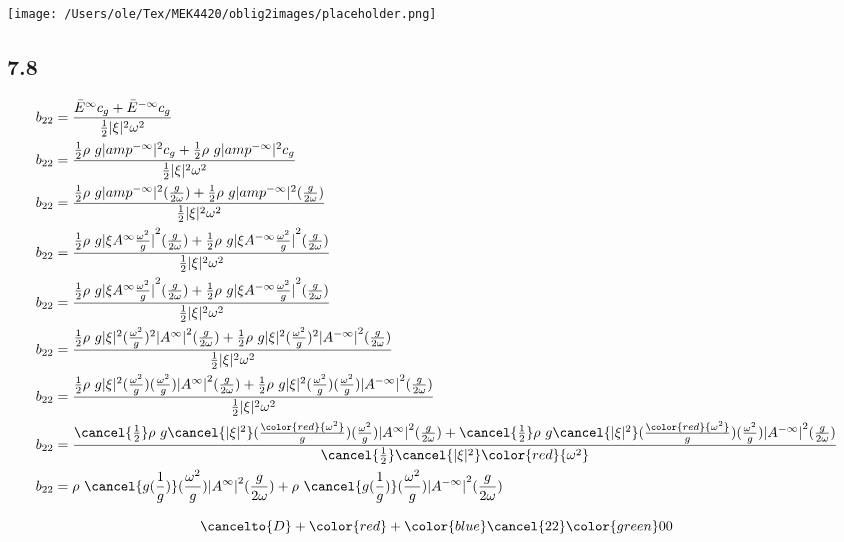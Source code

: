 {\noindent\texttt{[image: /Users/ole/Tex/MEK4420/oblig2images/placeholder.png]}
}

\subsection{7.8}

\begin{align}
	b_{22} &=  \frac{\bar{E}^{\infty} c_g + \bar{E}^{-\infty} c_g }{\frac{1}{2} |\xi|^2 \omega^2}\\
	b_{22} &=  \frac{\frac{1}{2}\rho g |amp^{-\infty}|^2  c_g + \frac{1}{2}\rho g |amp^{-\infty}|^2 c_g }{\frac{1}{2} |\xi|^2 \omega^2}\\
	b_{22} &=  \frac{\frac{1}{2}\rho g |amp^{-\infty}|^2  (\frac{g}{2\omega}) + \frac{1}{2}\rho g |amp^{-\infty}|^2 (\frac{g}{2\omega}) }{\frac{1}{2} |\xi|^2 \omega^2}\\
	b_{22} &=  \frac{\frac{1}{2}\rho g {|\xi A^{\infty} \frac{\omega^2}{g}|}^2  (\frac{g}{2\omega}) + \frac{1}{2}\rho g {|\xi A^{-\infty} \frac{\omega^2}{g}|}^2  (\frac{g}{2\omega}) }{\frac{1}{2} |\xi|^2 \omega^2}\\
	b_{22} &=  \frac{\frac{1}{2}\rho g {|\xi A^{\infty} \frac{\omega^2}{g}|}^2  (\frac{g}{2\omega}) + \frac{1}{2}\rho g {|\xi A^{-\infty} \frac{\omega^2}{g}|}^2  (\frac{g}{2\omega}) }{\frac{1}{2} |\xi|^2 \omega^2}\\
b_{22} &=  \frac{\frac{1}{2}\rho g |\xi|^2 (\frac{\omega^2}{g})^2 {| A^{\infty} |}^2  (\frac{g}{2\omega}) + \frac{1}{2}\rho g |\xi|^2  (\frac{\omega^2}{g})^2 {| A^{-\infty}|}^2  (\frac{g}{2\omega}) }{\frac{1}{2} |\xi|^2 \omega^2}\\
b_{22} &=  \frac{\frac{1}{2}\rho g |\xi|^2 (\frac{\omega^2}{g})(\frac{\omega^2}{g}) {| A^{\infty} |}^2  (\frac{g}{2\omega}) + \frac{1}{2}\rho g |\xi|^2  (\frac{\omega^2}{g})(\frac{\omega^2}{g}) {| A^{-\infty}|}^2  (\frac{g}{2\omega}) }{\frac{1}{2} |\xi|^2 \omega^2}\\
b_{22} &=  \frac{ \cancel{\frac{1}{2}}\rho g \cancel{|\xi|^2} (\frac{\color{red}{\omega^2}}{g})(\frac{\omega^2}{g}) {| A^{\infty} |}^2  (\frac{g}{2\omega}) + \cancel{\frac{1}{2}}\rho g \cancel{|\xi|^2}  (\frac{\color{red}{\omega^2}}{g})(\frac{\omega^2}{g}) {| A^{-\infty}|}^2  (\frac{g}{2\omega}) }{\cancel{\frac{1}{2}} \cancel{|\xi|^2} \color{red}{\omega^2}}\\
b_{22} &=   \rho \cancel{g  (\frac{1}{g})}(\frac{\omega^2}{g}) {| A^{\infty} |}^2  (\frac{g}{2\omega}) + \rho \cancel{g   (\frac{1}{g})}(\frac{\omega^2}{g}) {| A^{-\infty}|}^2  (\frac{g}{2\omega}) \\
\end{align}

\[
\cancelto{D} + \color{red} + \color{blue}\cancel{22}  \color{green}00
\]
